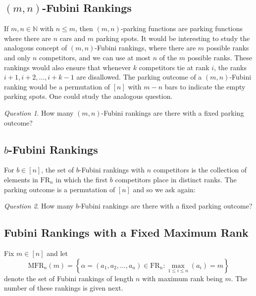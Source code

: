 \documentclass{amsart}
\theoremstyle{definition}
\theoremstyle{definition}
\theoremstyle{remark}
\newtheorem{question}{Question}[section]
\newcommand{\MFR}{\mathrm{MFR}}
\newcommand{\FR}[1]{\mathrm{FR}_{#1}}
\begin{document}
\subsection{$(m,n)$-Fubini Rankings}
If $m,n\in \mathbb{N}$ with $n\leq m$, then  $(m,n)$-parking functions are parking functions  where there are $n$ cars and $m$ parking spots. It would be interesting to study the analogous concept of $(m,n)$-Fubini rankings, where there are $m$ possible ranks and only $n$ competitors, and we can use at most $n$ of the $m$ possible ranks. These rankings would also ensure that whenever $k$ competitors tie at rank $i$, the ranks $i+1,i+2,\ldots,i+k-1$ are disallowed.
The parking outcome of a $(m,n)$-Fubini ranking would be a permutation of $[n]$ with $m-n$ bars to indicate the empty parking spots. 
One could study the analogous question.
\begin{question}
    How many $(m,n)$-Fubini rankings are there with a fixed parking outcome?
\end{question}
\subsection{$b$-Fubini Rankings}
For $b\in[n]$, the set of $b$-Fubini rankings with $n$ competitors is the collection of elements in $\FR{n}$ in which the first $b$ competitors place in distinct ranks. 
The parking outcome is  a permutation of $[n]$ and so we ask again: 
\begin{question}
    How many $b$-Fubini rankings are there with a fixed parking outcome?
\end{question}

\subsection{Fubini Rankings with a Fixed Maximum Rank}
Fix $m\in[n]$ and let 
\[\MFR_n(m)=\left\{\alpha=(a_1,a_2,\ldots,a_n)\in \FR{n}:\max_{1\leq i\leq n}(a_i)=m\right\}\] denote the set of Fubini rankings of length $n$ with maximum rank being $m$. The number of these rankings is given next.
\end{document}
